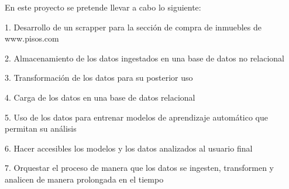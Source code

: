 En este proyecto se pretende llevar a cabo lo siguiente:

1. Desarrollo de un scrapper para la sección de compra de inmuebles de www.pisos.com

2. Almacenamiento de los datos ingestados en una base de datos no relacional

3. Transformación de los datos para su posterior uso

4. Carga de los datos en una base de datos relacional

5. Uso de los datos para entrenar modelos de aprendizaje automático que permitan su análisis

6. Hacer accesibles los modelos y los datos analizados al usuario final

7. Orquestar el proceso de manera que los datos se ingesten, transformen y analicen de manera prolongada en el tiempo